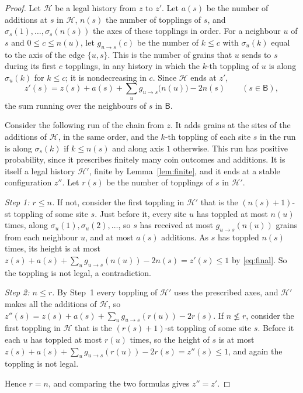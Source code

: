 \documentclass[11pt]{amsart}
\theoremstyle{definition}
\newcommand{\B}{\mathsf B}
\begin{document}
\begin{proof}
Let $\mathcal H$ be a legal history from $z$ to $z'$. Let $a(s)$ be the number of additions at $s$ in $\mathcal H$, $n(s)$ the number of topplings of $s$, and $\sigma_s(1),\dots,\sigma_s(n(s))$ the axes of these topplings in order. For a neighbour $u$ of $s$ and $0\le c\le n(u)$, let $g_{u\to s}(c)$ be the number of $k\le c$ with $\sigma_u(k)$ equal to the axis of the edge $\{u,s\}$. This is the number of grains that $u$ sends to $s$ during its first $c$ topplings, in any history in which the $k$-th toppling of $u$ is along $\sigma_u(k)$ for $k\le c$; it is nondecreasing in $c$. Since $\mathcal H$ ends at $z'$,
\begin{equation}\label{eq:final}
z'(s)=z(s)+a(s)+\sum_{u}g_{u\to s}\bigl(n(u)\bigr)-2n(s)\qquad(s\in\B),
\end{equation}
the sum running over the neighbours of $s$ in $\B$.

Consider the following run of the chain from $z$. It adds grains at the sites of the additions of $\mathcal H$, in the same order, and the $k$-th toppling of each site $s$ in the run is along $\sigma_s(k)$ if $k\le n(s)$ and along axis $1$ otherwise. This run has positive probability, since it prescribes finitely many coin outcomes and additions. It is itself a legal history $\mathcal H'$, finite by Lemma~\ref{lem:finite}, and it ends at a stable configuration $z''$. Let $r(s)$ be the number of topplings of $s$ in $\mathcal H'$.

\emph{Step 1: $r\le n$.} If not, consider the first toppling in $\mathcal H'$ that is the $(n(s)+1)$-st toppling of some site $s$. Just before it, every site $u$ has toppled at most $n(u)$ times, along $\sigma_u(1),\sigma_u(2),\dots$, so $s$ has received at most $g_{u\to s}(n(u))$ grains from each neighbour $u$, and at most $a(s)$ additions. As $s$ has toppled $n(s)$ times, its height is at most $z(s)+a(s)+\sum_ug_{u\to s}(n(u))-2n(s)=z'(s)\le1$ by \eqref{eq:final}. So the toppling is not legal, a contradiction.

\emph{Step 2: $n\le r$.} By Step~1 every toppling of $\mathcal H'$ uses the prescribed axes, and $\mathcal H'$ makes all the additions of $\mathcal H$, so $z''(s)=z(s)+a(s)+\sum_ug_{u\to s}(r(u))-2r(s)$. If $n\not\le r$, consider the first toppling in $\mathcal H$ that is the $(r(s)+1)$-st toppling of some site $s$. Before it each $u$ has toppled at most $r(u)$ times, so the height of $s$ is at most $z(s)+a(s)+\sum_ug_{u\to s}(r(u))-2r(s)=z''(s)\le1$, and again the toppling is not legal.

Hence $r=n$, and comparing the two formulas gives $z''=z'$.
\end{proof}
\end{document}
